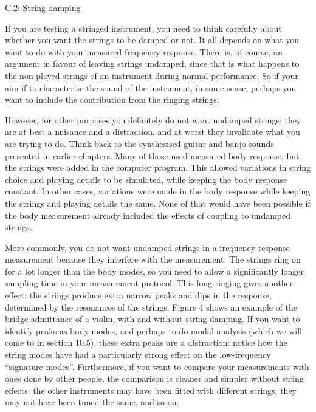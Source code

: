   C.2: String damping 

  If you are testing a stringed instrument, you need to think carefully about 
  whether you want the strings to be damped or not. It all depends on what you 
  want to do with your measured frequency response. There is, of course, an 
  argument in favour of leaving strings undamped, since that is what happens to 
  the non-played strings of an instrument during normal performance. So if your 
  aim if to characterise the sound of the instrument, in some sense, perhaps 
  you want to include the contribution from the ringing strings. 

  However, for other purposes you definitely do not want undamped strings: they 
  are at best a nuisance and a distraction, and at worst they invalidate what 
  you are trying to do. Think back to the synthesised guitar and banjo sounds 
  presented in earlier chapters. Many of those used measured body response, but 
  the strings were added in the computer program. This allowed variations in 
  string choice and playing details to be simulated, while keeping the body 
  response constant. In other cases, variations were made in the body response 
  while keeping the strings and playing details the same. None of that would 
  have been possible if the body measurement already included the effects of 
  coupling to undamped strings. 

  More commonly, you do not want undamped strings in a frequency response 
  measurement because they interfere with the measurement. The strings ring on 
  for a lot longer than the body modes, so you need to allow a significantly 
  longer sampling time in your measurement protocol. This long ringing gives 
  another effect: the strings produce extra narrow peaks and dips in the 
  response, determined by the resonances of the strings. Figure 4 shows an 
  example of the bridge admittance of a violin, with and without string 
  damping. If you want to identify peaks as body modes, and perhaps to do modal 
  analysis (which we will come to in section 10.5), these extra peaks are a 
  distraction: notice how the string modes have had a particularly strong 
  effect on the low-frequency ``signature modes''. Furthermore, if you want to 
  compare your measurements with ones done by other people, the comparison is 
  cleaner and simpler without string effects: the other instruments may have 
  been fitted with different strings, they may not have been tuned the same, 
  and so on. 


